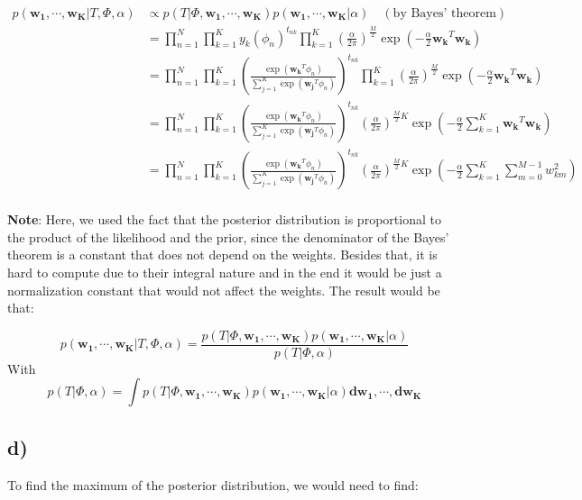 \documentclass[12pt,a4paper,oneside]{paper}
\begin{document}
\begin{align*}
    p(\bm{w_1}, \cdots, \bm{w_K} | T, \Phi, \alpha) &\propto p(T | \Phi, \bm{w_1}, \cdots, \bm{w_K}) p(\bm{w_1}, \cdots, \bm{w_K} | \alpha) \quad {(\text{by Bayes' theorem})} \\
    &= \prod_{n=1}^{N} \prod_{k=1}^{K} y_k(\phi_n)^{t_{nk}} \prod_{k=1}^{K} \left(\frac{\alpha}{2\pi}\right)^{\frac{M}{2}} \exp\left(-\frac{\alpha}{2} \bm{w_k}^T \bm{w_k}\right) \\
    &= \prod_{n=1}^{N} \prod_{k=1}^{K} \left(\frac{\exp(\bm{w_k}^T \phi_n)}{\sum_{j=1}^{K} \exp(\bm{w_j}^T \phi_n)}\right)^{t_{nk}} \prod_{k=1}^{K} \left(\frac{\alpha}{2\pi}\right)^{\frac{M}{2}} \exp\left(-\frac{\alpha}{2} \bm{w_k}^T \bm{w_k}\right) \\
    &= \prod_{n=1}^{N} \prod_{k=1}^{K} \left(\frac{\exp(\bm{w_k}^T \phi_n)}{\sum_{j=1}^{K} \exp(\bm{w_j}^T \phi_n)}\right)^{t_{nk}} \left(\frac{\alpha}{2\pi}\right)^{\frac{M}{2} K} \exp\left(-\frac{\alpha}{2} \sum_{k=1}^{K} \bm{w_k}^T \bm{w_k}\right) \\
    &= \prod_{n=1}^{N} \prod_{k=1}^{K} \left(\frac{\exp(\bm{w_k}^T \phi_n)}{\sum_{j=1}^{K} \exp(\bm{w_j}^T \phi_n)}\right)^{t_{nk}} \left(\frac{\alpha}{2\pi}\right)^{\frac{M}{2} K} \exp\left(-\frac{\alpha}{2} \sum_{k=1}^{K} \sum_{m=0}^{M - 1} w _{km}^2\right) \\
\end{align*}

\textbf{Note}: Here, we used the fact that the posterior distribution is proportional to the product of the likelihood and the prior, since the denominator of the Bayes' theorem is a constant that does not depend on the weights.
Besides that, it is hard to compute due to their integral nature and in the end it would be just a normalization constant that would not affect the weights. The result would be that:

$$
p(\bm{w_1}, \cdots, \bm{w_K} | T, \Phi, \alpha) = \frac{p(T | \Phi, \bm{w_1}, \cdots, \bm{w_K}) p(\bm{w_1}, \cdots, \bm{w_K} | \alpha)}{p(T | \Phi, \alpha)}
$$
With
$$
p(T | \Phi, \alpha) = \int p(T | \Phi, \bm{w_1}, \cdots, \bm{w_K}) p(\bm{w_1}, \cdots, \bm{w_K} | \alpha) \bm{dw_1}, \cdots, \bm{dw_K}
$$

\newpage
\subsection*{d)}

To find the maximum of the posterior distribution, we would need to find:
\end{document}
